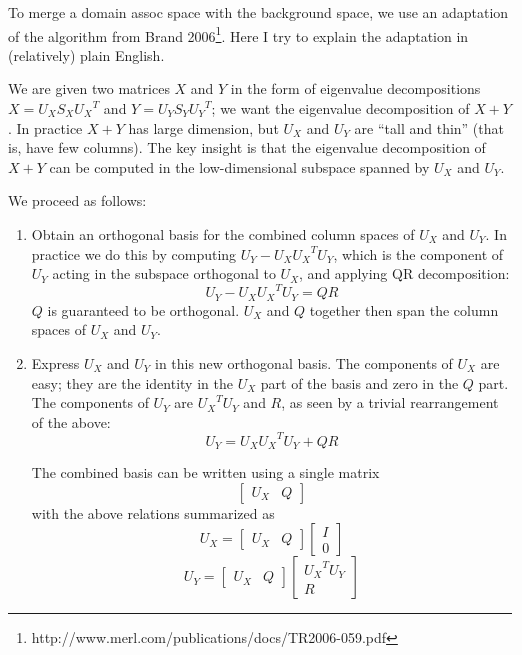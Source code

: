 \documentclass[english]{article}
\begin{document}
To merge a domain assoc space with the background space, we use an adaptation of the algorithm from Brand 2006\footnote{http://www.merl.com/publications/docs/TR2006-059.pdf}.  Here I try to explain the adaptation in (relatively) plain English.

We are given two matrices $X$ and $Y$ in the form of eigenvalue decompositions $X = U_X S_X {U_X}^T$ and $Y = U_Y S_Y {U_Y}^T$; we want the eigenvalue decomposition of $X + Y$.  In practice $X + Y$ has large dimension, but $U_X$ and $U_Y$ are ``tall and thin'' (that is, have few columns).  The key insight is that the eigenvalue decomposition of $X + Y$ can be computed in the low-dimensional subspace spanned by $U_X$ and $U_Y$.

We proceed as follows:

\begin{enumerate}

\item Obtain an orthogonal basis for the combined column spaces of $U_X$ and $U_Y$.  In practice we do this by computing $U_Y - U_X {U_X}^T U_Y$, which is the component of $U_Y$ acting in the subspace orthogonal to $U_X$, and applying QR decomposition:
\begin{equation}\label{QR} U_Y - U_X {U_X}^T U_Y = Q R \end{equation}
$Q$ is guaranteed to be orthogonal.  $U_X$ and $Q$ together then span the column spaces of $U_X$ and $U_Y$.

\item Express $U_X$ and $U_Y$ in this new orthogonal basis.  The components of $U_X$ are easy; they are the identity in the $U_X$ part of the basis and zero in the $Q$ part.  The components of $U_Y$ are ${U_X}^T U_Y$ and $R$, as seen by a trivial rearrangement of the above:
\[U_Y = U_X {U_X}^T U_Y + Q R\]

The combined basis can be written using a single matrix
\[\left[\begin{array}{cc} U_X & Q\end{array}\right]\]
with the above relations summarized as
\[U_X = \left[\begin{array}{cc} U_X & Q\end{array}\right] \left[\begin{array}{c} I \\ 0\end{array}\right]\]
\[U_Y = \left[\begin{array}{cc} U_X & Q\end{array}\right] \left[\begin{array}{c} {U_X}^T U_Y \\ R\end{array}\right]\]


\end{enumerate}
\end{document}
